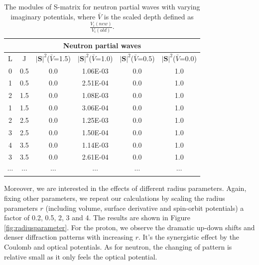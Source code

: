 \documentclass[12pt]{article}
\begin{document}
\begin{table}[]
\centering
\begin{tabular}{cccccc}
\toprule
\toprule
\multicolumn{6}{c}{Neutron partial waves}                                                                         \\
 \midrule
L                     & J                     & $|\mathbf{S}|^2$($\bar{V}$=1.5) & $|\mathbf{S}|^2$($\bar{V}$=1.0) & $|\mathbf{S}|^2$($\bar{V}$=0.5) & $|\mathbf{S}|^2$($\bar{V}$=0.0) \\
0 & 0.5 & 0.0                          & 1.06E-03                     & 0.0                          & 1.0                          \\
1 & 0.5 & 0.0                          & 2.51E-04                     & 0.0                          & 1.0                          \\
2 & 1.5 & 0.0                          & 1.08E-03                     & 0.0                          & 1.0                          \\
1 & 1.5 & 0.0                          & 3.06E-04                     & 0.0                          & 1.0                          \\
2 & 2.5 & 0.0                          & 1.25E-03                     & 0.0                          & 1.0                          \\
3 & 2.5 & 0.0                          & 1.50E-04                     & 0.0                          & 1.0                          \\
4 & 3.5 & 0.0                          & 1.14E-03                     & 0.0                          & 1.0                          \\
3 & 3.5 & 0.0                          & 2.61E-04                     & 0.0                          & 1.0                          \\   
$\cdots$           &$\cdots$                    & $\cdots$                            & $\cdots$                           & $\cdots$                           & $\cdots$                                                                \\
\bottomrule
\bottomrule
\end{tabular}
\caption{The modules of S-matrix for neutron partial waves with varying imaginary potentials, where $\bar{V}$ is the scaled depth defined as $\frac{V_i(new)}{V_i(old)}$.}
\label{nSmatrix}
\end{table}
	
	Moreover, we are interested in the effects of different radius parameters. Again, fixing other parameters, we repeat our calculations by scaling the radius parameters $r$ (including volume, surface derivative and spin-orbit potentials) a factor of 0.2, 0.5, 2, 3 and 4. The results are shown in Figure \ref{fig:radiusparameter}. For the proton, we observe the dramatic up-down shifts and denser diffraction patterns with increasing $r$. It's the synergistic effect by the Coulomb and optical potentials. As for neutron, the changing of pattern is relative small as it only feels the optical potential. 
	
\end{document}

